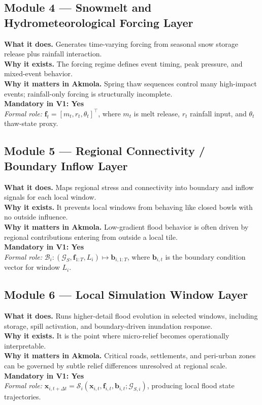 \documentclass[11pt,a4paper]{article}
\newcommand{\modulerole}[1]{\textit{Formal role:} #1}
\newcommand{\vone}{\textbf{Mandatory in V1: Yes}}
\begin{document}
\subsection{Module 4 --- Snowmelt and Hydrometeorological Forcing Layer}
\textbf{What it does.} Generates time-varying forcing from seasonal snow storage release plus rainfall interaction.\\
\textbf{Why it exists.} The forcing regime defines event timing, peak pressure, and mixed-event behavior.\\
\textbf{Why it matters in Akmola.} Spring thaw sequences control many high-impact events; rainfall-only forcing is structurally incomplete.\\
\vone\\
\modulerole{$\mathbf{f}_t = [m_t,r_t,\theta_t]^\top$, where $m_t$ is melt release, $r_t$ rainfall input, and $\theta_t$ thaw-state proxy.}

\subsection{Module 5 --- Regional Connectivity / Boundary Inflow Layer}
\textbf{What it does.} Maps regional stress and connectivity into boundary and inflow signals for each local window.\\
\textbf{Why it exists.} It prevents local windows from behaving like closed bowls with no outside influence.\\
\textbf{Why it matters in Akmola.} Low-gradient flood behavior is often driven by regional contributions entering from outside a local tile.\\
\vone\\
\modulerole{$\mathcal{B}_i: (\mathcal{G}_S,\mathbf{f}_{1:T},L_i)\mapsto \mathbf{b}_{i,1:T}$, where $\mathbf{b}_{i,t}$ is the boundary condition vector for window $L_i$.}

\subsection{Module 6 --- Local Simulation Window Layer}
\textbf{What it does.} Runs higher-detail flood evolution in selected windows, including storage, spill activation, and boundary-driven inundation response.\\
\textbf{Why it exists.} It is the point where micro-relief becomes operationally interpretable.\\
\textbf{Why it matters in Akmola.} Critical roads, settlements, and peri-urban zones can be governed by subtle relief differences unresolved at regional scale.\\
\vone\\
\modulerole{$\mathbf{x}_{i,t+\Delta t}=\mathcal{S}_i(\mathbf{x}_{i,t},\mathbf{f}_{i,t},\mathbf{b}_{i,t};\mathcal{G}_{S,i})$, producing local flood state trajectories.}
\end{document}
